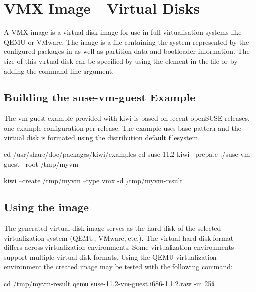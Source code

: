 \chapter{VMX Image---Virtual Disks}
\label{chapter:vmx}
\minitoc

A VMX image is a virtual disk image for use in full virtualisation
systems like QEMU or VMware. The image is a file containing the
system represented by the configured packages in  as well
as partition data and bootloader information. The size of
this virtual disk can be specified by using the  element
in the  file or by adding the  command
line argument.

\section{Building the suse-vm-guest Example}

The vm-guest example provided with kiwi is based on recent openSUSE releases,
one example configuration per release. The example uses base pattern and the
virtual disk is formated using the distribution default filesystem.

\begin{Command}{12cm}
cd /usr/share/doc/packages/kiwi/examples
cd suse-11.2
kiwi --prepare ./suse-vm-guest --root /tmp/myvm
\end{Command}

\begin{Command}{12cm}
kiwi --create /tmp/myvm --type vmx -d /tmp/myvm-result
\end{Command}

\section{Using the image}

The generated virtual disk image serves as the hard disk of the selected
virtualization system (QEMU, VMware, etc.). The virtual hard disk format 
differs across virtualization environments. Some virtualization environments
support multiple virtual disk formats. Using the QEMU virtualization 
environment the created image may be tested with the following command:

\begin{Command}{12cm}
cd /tmp/myvm-result
qemu suse-11.2-vm-guest.i686-1.1.2.raw -m 256
\end{Command}

